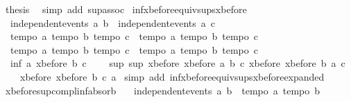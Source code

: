 \begin{isabellebody}
\ {\isacharquery}thesis\ \isamarkupfalse%
\ {\isacharparenleft}simp\ add{\isacharcolon}\ sup{\isachardot}assoc{\isacharparenright}\isanewline
{}\isamarkupfalse%
%
\endisatagproof
{\isafoldproof}%
%
\isadelimproof
\isanewline
%
\endisadelimproof
\isanewline
{}\isamarkupfalse%
\ inf{\isacharunderscore}xbefore{\isacharunderscore}equiv{\isacharunderscore}sups{\isacharunderscore}xbefore{\isacharunderscore}{}{\isacharcolon}\isanewline
\ \ {\isachardoublequoteopen}independent{\isacharunderscore}events\ a\ b\ {\isasymLongrightarrow}\ independent{\isacharunderscore}events\ a\ c\ \ {\isasymLongrightarrow}\ \isanewline
\ \ {\isasymlbrakk}tempo{}\ a{\isacharsemicolon}\ tempo{}\ b{\isacharsemicolon}\ tempo{}\ c{\isasymrbrakk}\ {\isasymLongrightarrow}\ {\isasymlbrakk}tempo{}\ a{\isacharsemicolon}\ tempo{}\ b{\isacharsemicolon}\ tempo{}\ c{\isasymrbrakk}\ {\isasymLongrightarrow}\ \isanewline
\ \ {\isasymlbrakk}tempo{}\ a{\isacharsemicolon}\ tempo{}\ b{\isacharsemicolon}\ tempo{}\ c{\isasymrbrakk}\ {\isasymLongrightarrow}\ {\isasymlbrakk}tempo{}\ a{\isacharsemicolon}\ tempo{}\ b{\isacharsemicolon}\ tempo{}\ c{\isasymrbrakk}\ {\isasymLongrightarrow}\isanewline
\ \ inf\ a\ {\isacharparenleft}xbefore\ b\ c{\isacharparenright}\ {\isacharequal}\ \isanewline
\ \ sup\ {\isacharparenleft}sup\ {\isacharparenleft}xbefore\ {\isacharparenleft}xbefore\ a\ b{\isacharparenright}\ c{\isacharparenright}\ {\isacharparenleft}xbefore\ {\isacharparenleft}xbefore\ b\ a{\isacharparenright}\ c{\isacharparenright}{\isacharparenright}\ \isanewline
\ \ \ \ {\isacharparenleft}xbefore\ {\isacharparenleft}xbefore\ b\ c{\isacharparenright}\ a{\isacharparenright}{\isachardoublequoteclose}\isanewline
%
\isadelimproof
%
\endisadelimproof
%
\isatagproof
{}\isamarkupfalse%
\ {\isacharparenleft}simp\ add{\isacharcolon}\ inf{\isacharunderscore}xbefore{\isacharunderscore}equiv{\isacharunderscore}sups{\isacharunderscore}xbefore{\isacharunderscore}expanded{\isacharparenright}%
\endisatagproof
{\isafoldproof}%
%
\isadelimproof
\isanewline
%
\endisadelimproof
\isanewline
{}\isamarkupfalse%
\ xbefore{\isacharunderscore}sup{\isacharunderscore}compl{\isacharunderscore}inf{\isacharunderscore}absorb{}{\isacharcolon}\ \isanewline
\ \ {\isachardoublequoteopen}independent{\isacharunderscore}events\ a\ b\ {\isasymLongrightarrow}\ {\isasymlbrakk}tempo{}\ a{\isacharsemicolon}\ tempo{}\ b{\isasymrbrakk}\ {\isasymLongrightarrow}\ \isanewline

\end{isabellebody}
